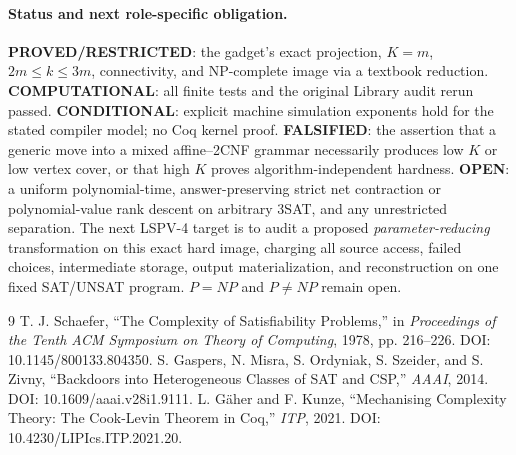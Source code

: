 \documentclass[11pt]{article}
\begin{document}
\paragraph{Status and next role-specific obligation.}
\textbf{PROVED/RESTRICTED}: the gadget's exact projection, $K=m$, $2m\le k\le3m$, connectivity, and NP-complete image via a textbook reduction. \textbf{COMPUTATIONAL}: all finite tests and the original Library audit rerun passed. \textbf{CONDITIONAL}: explicit machine simulation exponents hold for the stated compiler model; no Coq kernel proof. \textbf{FALSIFIED}: the assertion that a generic move into a mixed affine--2CNF grammar necessarily produces low $K$ or low vertex cover, or that high $K$ proves algorithm-independent hardness. \textbf{OPEN}: a uniform polynomial-time, answer-preserving strict net contraction or polynomial-value rank descent on arbitrary 3SAT, and any unrestricted separation. The next LSPV-4 target is to audit a proposed \emph{parameter-reducing} transformation on this exact hard image, charging all source access, failed choices, intermediate storage, output materialization, and reconstruction on one fixed SAT/UNSAT program. $P=NP$ and $P\ne NP$ remain open.

\begin{thebibliography}{9}
 T. J. Schaefer, ``The Complexity of Satisfiability Problems,'' in \emph{Proceedings of the Tenth ACM Symposium on Theory of Computing}, 1978, pp. 216--226. DOI: 10.1145/800133.804350.
 S. Gaspers, N. Misra, S. Ordyniak, S. Szeider, and S. Zivny, ``Backdoors into Heterogeneous Classes of SAT and CSP,'' \emph{AAAI}, 2014. DOI: 10.1609/aaai.v28i1.9111.
 L. G\"aher and F. Kunze, ``Mechanising Complexity Theory: The Cook-Levin Theorem in Coq,'' \emph{ITP}, 2021. DOI: 10.4230/LIPIcs.ITP.2021.20.
\end{thebibliography}
\end{document}
